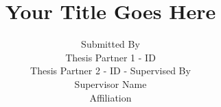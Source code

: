 \documentclass[a4paper,12pt,oneside]{report}
\begin{document}
\title{\LARGE {\bf Your Title Goes Here}\\
 \vspace*{4mm}
}

\author{Submitted By\\
Thesis Partner 1    -     ID
\\Thesis Partner 2 - ID  \linebreak  
\linebreak 
-
\linebreak  
\linebreak Supervised By\\ Supervisor Name \\ Affiliation
}

\normallinespacing


\let\cleardoublepage\clearpage

\maketitle

\preface

\let\cleardoublepage\clearpage


\clearpage

\let\cleardoublepage\clearpage

\let\cleardoublepage\clearpage
% 

\body




% 


% 



{}

\end{document}
